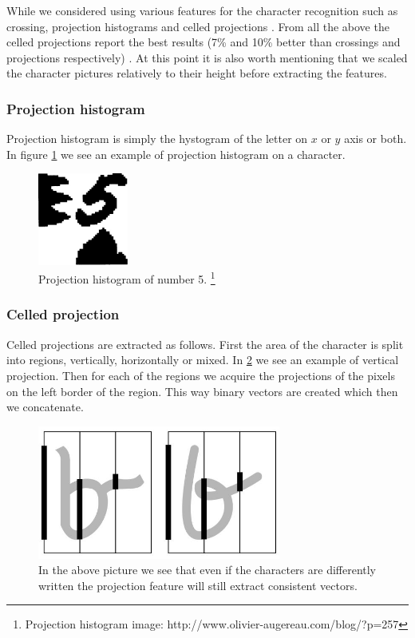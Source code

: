 While we considered using various features for the character recognition such as crossing, projection histograms and celled projections \cite{HWR:features1}\cite{HWR:features2}. From all the above the celled projections report the best results (7\% and 10\% better than crossings and projections respectively) \cite{HWR:features1}. At this point it is also worth mentioning that we scaled the character pictures relatively to their height before extracting the features.


\subsubsection{Projection histogram}
Projection histogram \cite{Chacko2015} is simply the hystogram of the letter on $x$ or $y$ axis or both. In figure \ref{fig:method:features:hist_proj} we see an example of projection histogram on a character.

\begin{figure}[ht]
	\centering
	\includegraphics[width=8em]{shared/img/hist_project.png}
	\caption{Projection histogram of number 5. \footnote{Projection histogram image: http://www.olivier-augereau.com/blog/?p=257}}
	\label{fig:method:features:hist_proj}
\end{figure}




\subsubsection{Celled projection}
Celled projections are extracted as follows. First the area of the character is split into regions, vertically, horizontally or mixed. In \ref{fig:method:features:feature} we see an example of vertical projection. Then for each of the regions we acquire the projections of the pixels on the left border of the region. This way binary vectors are created which then we concatenate.

\begin{figure}[t!]
	\includegraphics[width=8cm]{shared/img/projection_letter.jpg}
	\caption{In the above picture we see that even if the characters are differently written the projection feature will still extract consistent vectors.}
	\label{fig:method:features:feature}
\end{figure}

